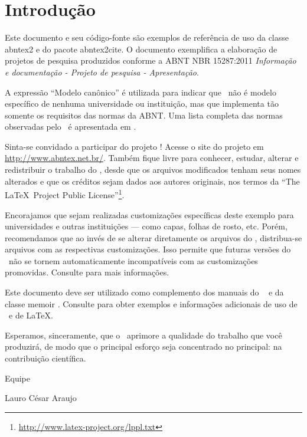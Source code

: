 


    \chapter*[Introdução]{Introdução}

    Este documento e seu código-fonte são exemplos de referência de uso da classe
    \textsf{abntex2} e do pacote \textsf{abntex2cite}. O documento
    exemplifica a elaboração de projetos de pesquisa produzidos
    conforme a ABNT NBR 15287:2011 \emph{Informação e documentação - Projeto de
    pesquisa - Apresentação}.

    A expressão ``Modelo canônico'' é utilizada para indicar que \abnTeX\ não é
    modelo específico de nenhuma universidade ou instituição, mas que implementa tão
    somente os requisitos das normas da ABNT. Uma lista completa das normas
    observadas pelo \abnTeX\ é apresentada em .

    Sinta-se convidado a participar do projeto \abnTeX! Acesse o site do projeto em
    \url{http://www.abntex.net.br/}. Também fique livre para conhecer,
    estudar, alterar e redistribuir o trabalho do \abnTeX, desde que os arquivos
    modificados tenham seus nomes alterados e que os créditos sejam dados aos
    autores originais, nos termos da ``The \LaTeX\ Project Public
    License''\footnote{\url{http://www.latex-project.org/lppl.txt}}.

    Encorajamos que sejam realizadas customizações específicas deste exemplo para
    universidades e outras instituições --- como capas, folhas de rosto, etc.
    Porém, recomendamos que ao invés de se alterar diretamente os arquivos do
    \abnTeX, distribua-se arquivos com as respectivas customizações.
    Isso permite que futuras versões do \abnTeX~não se tornem automaticamente
    incompatíveis com as customizações promovidas. Consulte
     para mais informações.

    Este documento deve ser utilizado como complemento dos manuais do \abnTeX\
    \cite{abntex2classe,abntex2cite,abntex2cite-alf} e da classe \textsf{memoir}
    \cite{memoir}. Consulte \citeonline{abntex2modelo} para obter
    exemplos e informações adicionais de uso de \abnTeX\ e de \LaTeX.

    Esperamos, sinceramente, que o \abnTeX\ aprimore a qualidade do trabalho que
    você produzirá, de modo que o principal esforço seja concentrado no principal:
    na contribuição científica.

    Equipe \abnTeX

    Lauro César Araujo

